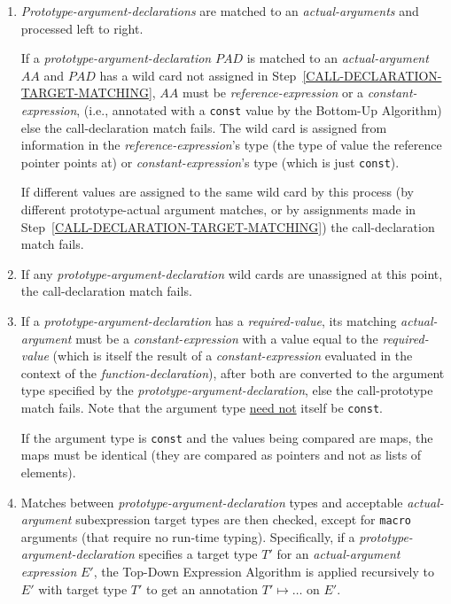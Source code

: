 \documentclass[12pt]{article}
\begin{document}
\begin{enumerate}
\item\label{CALL-DECLARATION-ARGUMENT-MATCHING}
{\em Prototype-argument-declarations} are matched to
an {\em actual-arguments} and processed left to right.

If a {\em prototype-argument-declaration} $PAD$ is matched
to an {\em actual-argument} $AA$ and $PAD$ has a wild card not
assigned in Step~\ref{CALL-DECLARATION-TARGET-MATCHING},
$AA$ must be {\em reference-expression} or a {\em constant-expression},
(i.e., annotated with a {\tt const} value by the Bottom-Up Algorithm)
else the
call-declaration match fails.  The wild card is assigned from
information in the {\em reference-expression}'s
type (the type of value the reference pointer points at) or
{\em constant-expression}'s type (which is just {\tt const}).

If different values are assigned to the same wild card by this
process (by different prototype-actual argument matches, or by
assignments made in Step~\ref{CALL-DECLARATION-TARGET-MATCHING})
the call-declaration match fails.

\item\label{CALL-DECLARATION-UNASSIGNED-WILDCARDS}
If any {\em prototype-argument-declaration} wild cards are unassigned
at this point,
the call-declaration match fails.

\item\label{CALL-DECLARATION-REQUIRED-VALUES}
If a {\em prototype-argument-declaration} has a {\em required-value},
its matching {\em actual-argument} must be a {\em constant-expression} with
a value equal to the {\em required-value} (which is itself the result
of a {\em constant-expression} evaluated in the context of the
{\em function-declaration}), after both are converted
to the argument type specified by the {\em prototype-argument-declaration},
else the call-prototype
match fails.  Note that the argument type \underline{need not} itself
be {\tt const}.

If the argument type is {\tt const} and the values being compared are
maps, the maps must be identical (they are compared as pointers and
not as lists of elements).

\item\label{CALL-DECLARATION-ARGUMENT-TYPING}
Matches between {\em prototype-argument-declaration} types
and acceptable {\em actual-argu\-ment} subexpression target types
are then checked, except for {\tt macro} arguments (that require
no run-time typing).  Specifically, if a {\em prototype-argument-declaration}
specifies a target type $T'$ for an {\em actual-argument} {\em expression} $E'$,
the Top-Down Expression Algorithm
is applied recursively to $E'$ with target type $T'$ to get
an annotation $T'\mapsto\ldots$ on $E'$.


\end{enumerate}
\end{document}
